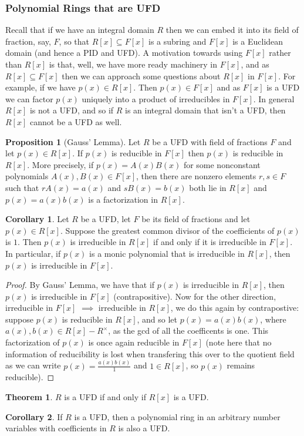 \documentclass[9pt,reqno]{amsart}
\theoremstyle{definition}
\newtheorem{theorem}{Theorem}[section]
\newtheorem{prop}{Proposition}[section]
\newtheorem{coro}{Corollary}[section]
\begin{document}
\subsubsection{Polynomial Rings that are UFD} Recall that if we have an integral domain $R$ then we can embed it into its field of fraction, say, $F$, so that $R[x] \subseteq F[x]$ is a subring and $F[x]$ is a Euclidean domain (and hence a PID and UFD). A motivation towards using $F[x]$ rather than $R[x]$ is that, well, we have more ready machinery in $F[x]$, and as $R[x] \subseteq F[x]$ then we can approach some questions about $R[x]$ in $F[x]$. For example, if we have $p(x) \in R[x]$. Then $p(x) \in F[x]$ and as $F[x]$ is a UFD we can factor $p(x)$ uniquely into a product of irreducibles in $F[x]$. In general $R[x]$ is not a UFD, and so if $R$ is an integral domain that isn't a UFD, then $R[x]$ cannot be a UFD as well. 



\begin{prop}[Gauss' Lemma] Let $R$ be a UFD with field of fractions $F$ and let $p(x) \in R[x]$. If $p(x)$ is reducible in $F[x]$ then $p(x)$ is reducible in $R[x]$. More precisely, if $p(x) = A(x)B(x)$ for some nonconstant polynomials $A(x), B(x) \in F[x]$, then there are nonzero elements $r,s \in F$ such that $r A(x) = a(x)$ and $sB(x) = b(x)$ both lie in $R[x]$ and $p(x) = a(x) b(x)$ is a factorization in $R[x]$. 	
\end{prop}
\begin{coro}
Let $R$ be a UFD, let $F$ be its field of fractions and let $p(x) \in R[x]$. Suppose the greatest common divisor of the coefficients of $p(x)$ is $1$. Then $p(x)$ is irreducible in $R[x]$ if and only if it is irreducible in $F[x]$. In particular, if $p(x)$ is a monic polynomial that is irreducible in $R[x]$, then $p(x)$ is irreducible in $F[x]$. 
\end{coro}
\begin{proof}
	By Gauss' Lemma, we have that if $p(x)$ is irreducible in $R[x]$, then $p(x)$ is irreducible in $F[x]$ (contrapositive). Now for the other direction, irreducible in $F[x]$ $\implies$ irreducible in $R[x]$, we do this again by contrapostive: suppose $p(x)$ is reducible in $R[x]$, and so let $p(x) = a(x) b (x)$, where $a(x), b(x) \in R[x]-R^\times $, as the gcd of all the coefficents is one. This factorization of $p(x)$ is once again reducible in $F[x]$ (note here that no information of reducibility is lost when transfering this over to the quotient field as we can write $p(x) = \frac{a(x)b(x)}{1}$ and $1 \in R[x]$, so $p(x)$ remains reducible). 
\end{proof}
\begin{theorem}
	$R$ is a UFD if and only if $R[x]$ is a UFD.
\end{theorem}
\begin{coro}
If $R$ is a UFD, then a polynomial ring in an arbitrary number variables with coefficients in $R$ is also a UFD. 	
\end{coro}
\end{document}
